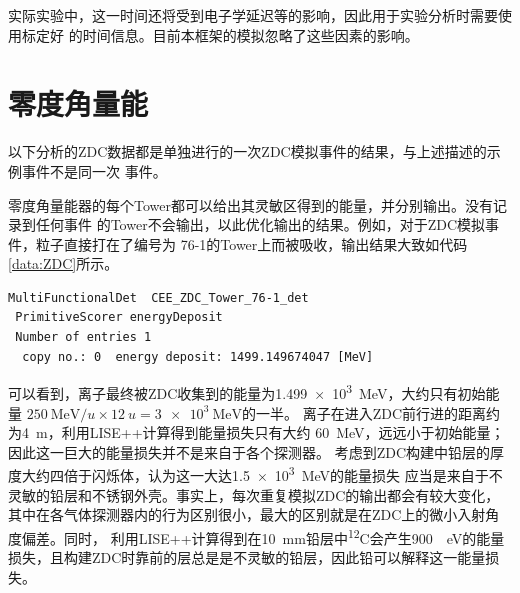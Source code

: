 \documentclass[bachelor,openany,oneside,color]{buaathesis}
\def\PrimaryParticle{\textsuperscript{12}C}
\begin{document}
实际实验中，这一时间还将受到电子学延迟等的影响，因此用于实验分析时需要使用标定好
的时间信息。目前本框架的模拟忽略了这些因素的影响。

\section{零度角量能}

以下分析的ZDC数据都是单独进行的一次ZDC模拟事件的结果，与上述描述的示例事件不是同一次
事件。

零度角量能器的每个Tower都可以给出其灵敏区得到的能量，并分别输出。没有记录到任何事件
的Tower不会输出，以此优化输出的结果。例如，对于ZDC模拟事件，粒子直接打在了编号为
76-1的Tower上而被吸收，输出结果大致如代码\ref{data:ZDC}所示。
\begin{lstlisting}[caption={ZDC输出},label={data:ZDC},firstnumber=4249,lastline=4256]
 MultiFunctionalDet  CEE_ZDC_Tower_76-1_det
 PrimitiveScorer energyDeposit
 Number of entries 1
  copy no.: 0  energy deposit: 1499.149674047 [MeV]
\end{lstlisting}
可以看到，离子最终被ZDC收集到的能量为\SI{1.499e3}{\mega\eV}，大约只有初始能量
$\SI{250}{\mega\eV/u}\times\SI{12}{u}=\SI{3e3}{\mega\eV}$的一半。
离子在进入ZDC前行进的距离约为\SI{4}{\meter}，利用LISE++计算得到能量损失只有大约
\SI{60}{\mega\eV}，远远小于初始能量；因此这一巨大的能量损失并不是来自于各个探测器。
考虑到ZDC构建中铅层的厚度大约四倍于闪烁体，认为这一大达\SI{1.5e3}{\mega\eV}的能量损失
应当是来自于不灵敏的铅层和不锈钢外壳。事实上，每次重复模拟ZDC的输出都会有较大变化，
其中在各气体探测器内的行为区别很小，最大的区别就是在ZDC上的微小入射角度偏差。同时，
利用LISE++计算得到在\SI{10}{\milli\meter}铅层中\PrimaryParticle 会产生\SI{900}{\mega
\eV}的能量损失，且构建ZDC时靠前的层总是是不灵敏的铅层，因此铅可以解释这一能量损失。
\end{document}
